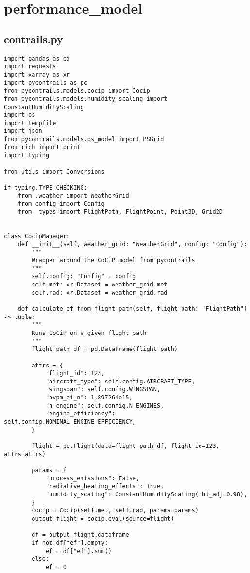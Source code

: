 \section{performance_model}
\subsection{contrails.py}
\begin{verbatim}
import pandas as pd
import requests
import xarray as xr
import pycontrails as pc
from pycontrails.models.cocip import Cocip
from pycontrails.models.humidity_scaling import ConstantHumidityScaling
import os
import tempfile
import json
from pycontrails.models.ps_model import PSGrid
from rich import print
import typing

from utils import Conversions

if typing.TYPE_CHECKING:
    from .weather import WeatherGrid
    from config import Config
    from _types import FlightPath, FlightPoint, Point3D, Grid2D


class CocipManager:
    def __init__(self, weather_grid: "WeatherGrid", config: "Config"):
        """
        Wrapper around the CoCiP model from pycontrails
        """
        self.config: "Config" = config
        self.met: xr.Dataset = weather_grid.met
        self.rad: xr.Dataset = weather_grid.rad

    def calculate_ef_from_flight_path(self, flight_path: "FlightPath") -> tuple:
        """
        Runs CoCiP on a given flight path
        """
        flight_path_df = pd.DataFrame(flight_path)

        attrs = {
            "flight_id": 123,
            "aircraft_type": self.config.AIRCRAFT_TYPE,
            "wingspan": self.config.WINGSPAN,
            "nvpm_ei_n": 1.897264e15,
            "n_engine": self.config.N_ENGINES,
            "engine_efficiency": self.config.NOMINAL_ENGINE_EFFICIENCY,
        }

        flight = pc.Flight(data=flight_path_df, flight_id=123, attrs=attrs)

        params = {
            "process_emissions": False,
            "radiative_heating_effects": True,
            "humidity_scaling": ConstantHumidityScaling(rhi_adj=0.98),
        }
        cocip = Cocip(self.met, self.rad, params=params)
        output_flight = cocip.eval(source=flight)

        df = output_flight.dataframe
        if not df["ef"].empty:
            ef = df["ef"].sum()
        else:
            ef = 0


\end{verbatim}
